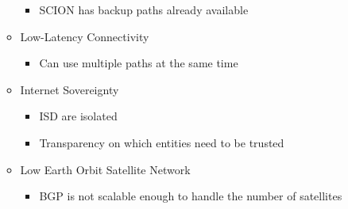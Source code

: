 \begin{itemize}
\begin{itemize}
                \begin{itemize}
                    \item SCION has backup paths already available
                \end{itemize}
            \item Low-Latency Connectivity
                \begin{itemize}
                    \item Can use multiple paths at the same time
                \end{itemize}
            \item Internet Sovereignty
                \begin{itemize}
                    \item ISD are isolated
                    \item Transparency on which entities need to be trusted
                \end{itemize}
            \item Low Earth Orbit Satellite Network
                \begin{itemize}
                    \item BGP is not scalable enough to handle the number of satellites
                \end{itemize}
        \end{itemize}
\end{itemize}
